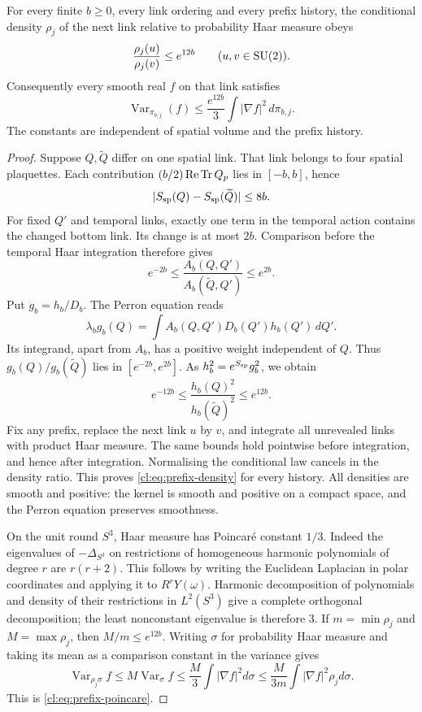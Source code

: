 \begin{theorem}\label{cl:thm:link-poincare}
For every finite $b\ge0$, every link ordering and every prefix history,
the conditional density $\rho_j$ of the next link relative to probability
Haar measure obeys
\begin{equation}\label{cl:eq:prefix-density}
\frac{\rho_j(u)}{\rho_j(v)}\le e^{12b}
\qquad(u,v\in\mathrm{SU}(2)).
\end{equation}
Consequently every smooth real $f$ on that link satisfies
\begin{equation}\label{cl:eq:prefix-poincare}
\operatorname{Var}_{\pi_{b,j}}(f)
\le \frac{e^{12b}}3\int |\nabla f|^2\,d\pi_{b,j}.
\end{equation}
The constants are independent of spatial volume and the prefix history.
\end{theorem}
\begin{proof}
Suppose $Q,\widetilde Q$ differ on one spatial link. That link belongs
to four spatial plaquettes. Each contribution $(b/2)\operatorname{Re}\operatorname{Tr} Q_p$ lies in
$[-b,b]$, hence
\[
|S_{\rm sp}(Q)-S_{\rm sp}(\widetilde Q)|\le8b.
\]
For fixed $Q'$ and temporal links, exactly one term in the temporal
action contains the changed bottom link. Its change is at most $2b$.
Comparison before the temporal Haar integration therefore gives
\[
e^{-2b}\le\frac{A_b(Q,Q')}{A_b(\widetilde Q,Q')}\le e^{2b}.
\]
Put $g_b=h_b/D_b$. The Perron equation reads
\[
\lambda_b g_b(Q)=\int A_b(Q,Q')D_b(Q')h_b(Q')\,dQ'.
\]
Its integrand, apart from $A_b$, has a positive weight independent of $Q$.
Thus $g_b(Q)/g_b(\widetilde Q)$ lies in $[e^{-2b},e^{2b}]$.
As $h_b^2=e^{S_{\rm sp}}g_b^2$, we obtain
\begin{equation}\label{cl:eq:vacuum-local-ratio}
e^{-12b}\le\frac{h_b(Q)^2}{h_b(\widetilde Q)^2}\le e^{12b}.
\end{equation}
Fix any prefix, replace the next link $u$ by $v$, and integrate all
unrevealed links with product Haar measure. The same bounds hold pointwise
before integration, and hence after integration. Normalising the
conditional law cancels in the density ratio. This proves
\eqref{cl:eq:prefix-density} for every history. All densities are smooth
and positive: the kernel is smooth and positive on a compact space, and
the Perron equation preserves smoothness.

On the unit round $S^3$, Haar measure has Poincar\'e constant $1/3$.
Indeed the eigenvalues of $-\Delta_{S^3}$ on restrictions of homogeneous
harmonic polynomials of degree $r$ are $r(r+2)$. This follows by writing
the Euclidean Laplacian in polar coordinates and applying it to
$R^rY(\omega)$. Harmonic decomposition of polynomials and density of their
restrictions in $L^2(S^3)$ give a complete orthogonal decomposition;
the least nonconstant eigenvalue is therefore $3$.
If $m=\min\rho_j$ and $M=\max\rho_j$, then $M/m\le e^{12b}$.
Writing $\sigma$ for probability Haar measure and taking its mean as a
comparison constant in the variance gives
\[
\operatorname{Var}_{\rho_j\sigma}f
\le M\operatorname{Var}_{\sigma}f
\le \frac M3\int|\nabla f|^2d\sigma
\le \frac{M}{3m}\int|\nabla f|^2\rho_jd\sigma.
\]
This is \eqref{cl:eq:prefix-poincare}.
\end{proof}


